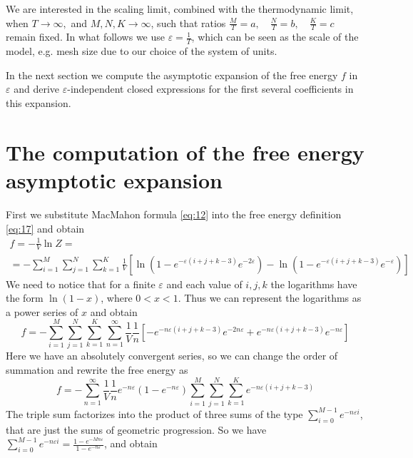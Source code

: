 \documentclass{article}
\begin{document}
We are interested in the scaling limit, combined with the thermodynamic limit, when $ T\to \infty,$
and $M,N,K\to \infty$, such that ratios $\frac{M}{T}=a,\quad \frac{N}{T}=b, \quad \frac{K}{T}=c$
remain fixed. In what follows we use $\varepsilon=\frac{1}{T}$, which can be seen as the scale of
the model, e.g. mesh size due to our choice of the system of units.

In the next section we compute the asymptotic expansion of the free energy $f$ in $\varepsilon$ and
derive $\varepsilon$-independent closed expressions for the first several coefficients in this
expansion.
  
\section{The computation of the free energy asymptotic expansion}
\label{sec:free-energy-scaling}
First we substitute MacMahon formula \eqref{eq:12} into the free energy definition \eqref{eq:17} and
obtain
\begin{multline}
  \label{eq:20}
    f=-\frac{1}{V}\ln Z =\\=- \sum_{i=1}^{M} \sum_{j=1}^{N} \sum_{k=1}^{K} \frac{1}{V}\left[
  \ln\left(1-e^{-\varepsilon (i+j+k-3)} e^{-2\varepsilon}\right) -\ln\left(1-e^{-\varepsilon
      (i+j+k-3)} e^{-\varepsilon}\right)\right] 
\end{multline}
We need to notice that for a finite $\varepsilon$ and each value of $i,j,k$ the logarithms have the
form $\ln(1-x)$, where $0<x<1$. Thus we can represent the logarithms as a power series of $x$ and
obtain
\begin{equation}
  \label{eq:7}
  f=-\sum_{i=1}^{M} \sum_{j=1}^{N} \sum_{k=1}^{K}\sum_{n=1}^{\infty}
  \frac{1}{V}\frac{1}{n}\left[-e^{-n\varepsilon (i+j+k-3)} e^{-2n\varepsilon}+e^{-n\varepsilon
      (i+j+k-3)} e^{-n\varepsilon}\right] 
\end{equation}
Here we have an absolutely convergent series, so we can change the order of summation and rewrite
the free energy as
\begin{equation}
  \label{eq:37}
  f=-\sum_{n=1}^{\infty}
  \frac{1}{V}\frac{1}{n}e^{-n\varepsilon}\left(1-e^{-n\varepsilon}\right)\sum_{i=1}^{M}
  \sum_{j=1}^{N} \sum_{k=1}^{K}e^{-n\varepsilon (i+j+k-3)} 
\end{equation}
The triple sum factorizes into the product of three sums of the type $\sum_{i=0}^{M-1}e^{-n\varepsilon
  i}$, that are just the
 sums of geometric progression. So we have $\sum_{i=0}^{M-1}e^{-n\varepsilon
  i}=\frac{1-e^{-Mn\varepsilon}}{1-e^{-n\varepsilon}}$, and obtain
\end{document}
